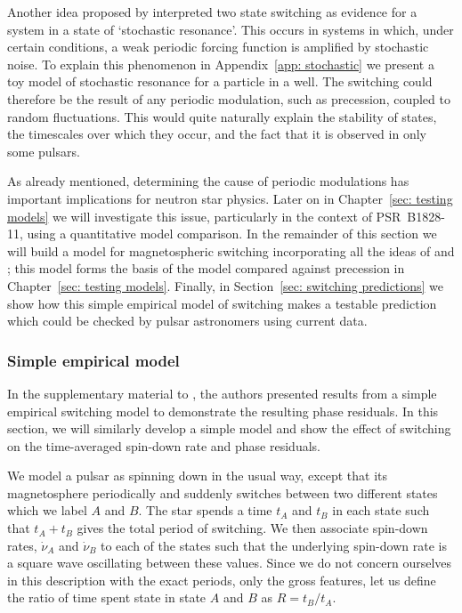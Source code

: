 Another idea proposed by \citet{Cordes2013} interpreted two state
switching as evidence for a system in a state of `stochastic resonance'.  This
occurs in systems in which, under certain conditions, a weak periodic forcing
function is amplified by stochastic noise. To explain this phenomenon in
Appendix~\ref{app: stochastic} we present a toy model of stochastic resonance
for a particle in a well. The switching could therefore be the result of any
periodic modulation, such as precession, coupled to random fluctuations. This
would quite naturally explain the stability of states, the timescales over
which they occur, and the fact that it is observed in only some pulsars.

As already mentioned, determining the cause of periodic modulations has
important implications for neutron star physics. Later on in Chapter~\ref{sec:
testing models} we will investigate this issue, particularly in the context of
PSR~B1828-11, using a quantitative model comparison. In the remainder of this
section we will build a model for magnetospheric switching incorporating all
the ideas of \citet{Lyne2010} and \citet{Perera2015}; this model forms the basis
of the model compared against precession in Chapter~\ref{sec: testing models}.
Finally, in Section~\ref{sec: switching predictions} we show how this simple
empirical model of switching makes a testable prediction which could be
checked by pulsar astronomers using current data.

\subsubsection{Simple empirical model}

In the supplementary material to \citet{Lyne2010}, the authors presented
results from a simple empirical switching model to demonstrate the resulting
phase residuals. In this section, we will similarly develop a simple model and
show the effect of switching on the time-averaged spin-down rate and phase
residuals.

We model a pulsar as spinning down in the usual way, except that its
magnetosphere periodically and suddenly switches between two different states which
we label $A$ and $B$. The star spends a time $t_A$ and $t_B$ in each state such
that $t_A+t_B$ gives the total period of switching. We then associate spin-down
rates, $\dot{\nu}_{A}$ and $\dot{\nu}_{B}$ to each of the states such that the
underlying spin-down rate is a square wave oscillating between these values.
Since we do not concern ourselves in this description with the exact periods,
only the gross features, let us define the ratio of time spent state in state
$A$ and $B$ as $R = t_{B}/t_{A}$.

